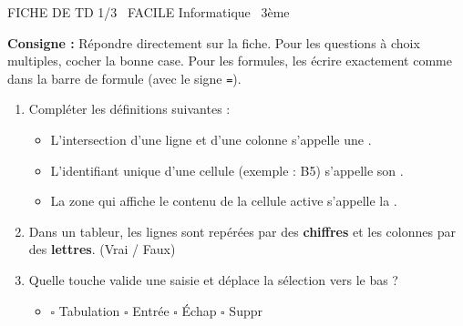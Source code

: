 \documentclass[11pt]{article}
\begin{document}
\begin{tcolorbox}[enhanced,colback=popink,colframe=popink,arc=10pt,boxrule=0pt,left=12pt,right=12pt,top=9pt,bottom=9pt]
{\color{white}\popxbold\small FICHE DE TD 1/3 \textbullet\ FACILE \hfill Informatique \textbullet\ 3ème\par}
\end{tcolorbox}
\vspace{4pt}
\noindent \textbf{Consigne :} Répondre directement sur la fiche. Pour les questions à choix multiples, cocher la bonne case. Pour les formules, les écrire exactement comme dans la barre de formule (avec le signe \texttt{=}).

\begin{exercice}
\begin{enumerate}
    \item Compléter les définitions suivantes :
    \begin{itemize}
        \item L'intersection d'une ligne et d'une colonne s'appelle une \underline{\hspace{4cm}}.
        \item L'identifiant unique d'une cellule (exemple : B5) s'appelle son \underline{\hspace{4cm}}.
        \item La zone qui affiche le contenu de la cellule active s'appelle la \underline{\hspace{4cm}}.
    \end{itemize}
    \item Dans un tableur, les lignes sont repérées par des \textbf{chiffres} et les colonnes par des \textbf{lettres}. \hfill (Vrai / Faux)
    \item Quelle touche valide une saisie et déplace la sélection vers le bas ?
    \begin{itemize}
        \item $\square$ Tabulation \quad $\square$ Entrée \quad $\square$ Échap \quad $\square$ Suppr
    \end{itemize}
\end{enumerate}
\end{exercice}
\end{document}
